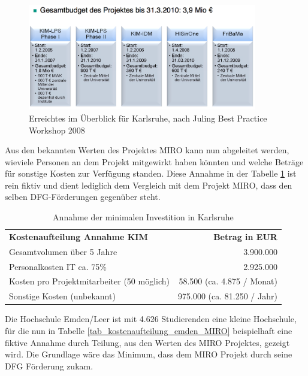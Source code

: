 \begin{figure}[h!]
	\centering
	\includegraphics[width=10cm]{kapitel/gruppe4_2/bilder/uberblick_projekt_KIM}
	\caption{Erreichtes im Überblick für Karlsruhe, nach Juling Best Practice Workshop 2008}
	\label{fig_uberblick_projekt_KIM}
\end{figure}

Aus den bekannten Werten des Projektes MIRO kann nun abgeleitet werden, wieviele Personen an dem Projekt mitgewirkt haben könnten und welche Beträge für sonstige Kosten zur Verfügung standen. Diese Annahme in der Tabelle \ref{tab_minimale_investition_karlsruhe} ist rein fiktiv und dient lediglich dem Vergleich mit dem Projekt MIRO, dass den selben DFG-Förderungen gegenüber steht.

\begin{table}[h!]
	\begin{tabularx}{\textwidth}{l|r}
		\hline
		\textbf{Kostenaufteilung Annahme KIM} & \textbf{Betrag in EUR}\\
		Gesamtvolumen über 5 Jahre & 3.900.000\\
		Personalkosten IT ca. 75\% & 2.925.000\\
		Kosten pro Projektmitarbeiter (50 möglich) & 58.500 (ca. 4.875 / Monat)\\ 
		Sonstige Kosten (unbekannt) & 975.000 (ca. 81.250 / Jahr)\\
		\hline
	\end{tabularx}
	\caption{Annahme der minimalen Investition in Karlsruhe}
	\label{tab_minimale_investition_karlsruhe}
\end{table}

Die Hochschule Emden/Leer ist mit 4.626 Studierenden eine kleine Hochschule, für die nun in Tabelle \ref{tab_kostenaufteilung_emden_MIRO} beispielhaft eine fiktive Annahme durch Teilung, aus den Werten des MIRO Projektes, gezeigt wird. Die Grundlage wäre das Minimum, dass dem MIRO Projekt durch seine DFG Förderung zukam.

